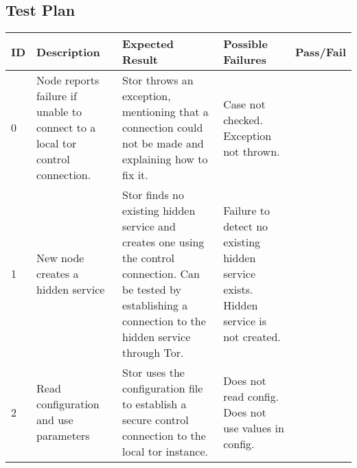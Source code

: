 \begin{landscape}
	\section{Test Plan} \label{testplan}
	
	\begin{table}[h]
		\begin{tabular}{| l | p{7cm} | p{7cm} | p{4cm} | l |}
			\hline
			ID & Description & Expected Result & Possible Failures & Pass/Fail \\ \hline
			
			0 & Node reports failure if unable to connect to a local tor control connection. & Stor throws an exception, mentioning that a connection could not be made and explaining how to fix it. & Case not checked. \newline Exception not thrown. & \\ \hline
			
			1 & New node creates a hidden service & Stor finds no existing hidden service and creates one using the control connection. Can be tested by establishing a connection to the hidden service through Tor. & Failure to detect no existing hidden service exists. \newline Hidden service is not created. & \\ \hline
			
			2 & Read configuration and use parameters & Stor uses the configuration file to establish a secure control connection to the local tor instance. & Does not read config. \newline Does not use values in config. & \\ \hline
		\end{tabular}
	\end{table}
\end{landscape}